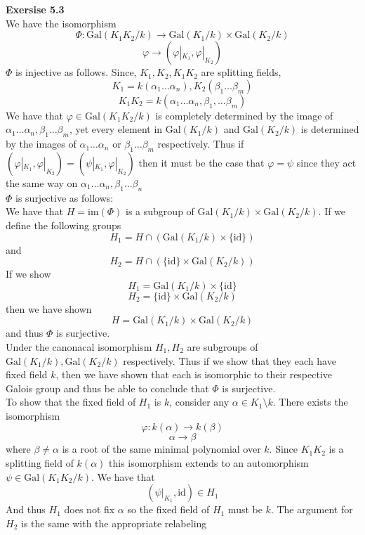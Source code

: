 \documentclass[12pt]{article}
\newenvironment{ques}[1]{\textbf{Exersise #1}\vspace{1 mm}\\ }{\bigskip}
\theoremstyle{definition}
\renewcommand{\a}{\alpha}
\renewcommand{\b}{\beta}
\newcommand{\Gal}{\text{Gal}}
\newcommand{\im}{\text{im}}
\newcommand{\id}{\text{id}}
\begin{document}
\begin{ques}{5.3}
	We have the isomorphism
	$$\Phi:\Gal(K_1K_2/k) \to \Gal(K_1/k) \times \Gal(K_2/k)$$
	$$\varphi \to (\varphi|_{K_1}, \varphi|_{K_2})$$
	$\Phi$ is injective as follows. Since, $K_1, K_2, K_1K_2$ are splitting fields,
	$$K_1 = k(\a_1 \dots \a_n), K_2(\b_1 \dots \b_m)$$
	$$K_1K_2 = k(\a_1 \dots \a_n, \b_1, \dots \b_m)$$
	We have that $\varphi \in \Gal(K_1K_2/k)$ is completely determined by the
	image of $\a_1 \dots \a_n, \b_1 \dots \b_m$, yet every element in
	$\Gal(K_1/k)$ and $\Gal(K_2/k)$ is determined by the images of $\a_1 \dots
	\a_n$ or $\b_1 \dots \b_m$ respectively. Thus if
	$(\varphi|_{K_1},\varphi|_{K_2}) = (\psi|_{K_1},\varphi|_{K_2})$ then it must
	be the case that $\varphi = \psi$ since they act the same way on $\a_1
	\dots \a_n, \b_1 \dots \b_n$
	\\
	$\Phi$ is surjective as follows: \\
	We have that $H = \im(\Phi)$ is a subgroup of $\Gal(K_1/k) \times
	\Gal(K_2/k)$. If we define the following groups
	$$H_1 = H \cap (\Gal(K_1/k) \times \{\id\})$$
	and
	$$H_2 = H \cap (\{\id\}\times \Gal(K_2/k))$$
	If we show 
	$$H_1 = \Gal(K_1/k) \times \{\id\}$$
	$$H_2 = \{\id\}\times \Gal(K_2/k)$$
	then we have shown 
	$$H = \Gal(K_1/k) \times \Gal(K_2/k)$$
	and thus $\Phi$ is surjective.\\
	Under the canonacal isomorphism $H_1, H_2$ are subgroups of $\Gal(K_1/k),
	\Gal(K_2/k)$ respectively. Thus if we show that they each have fixed field
	$k$, then we have shown that each is isomorphic to their respective Galois group
	and thus be able to conclude that $\Phi$ is surjective.\\
	To show that the fixed field of $H_1$ is $k$, consider any $\a \in K_1
	\setminus k$. There exists the isomorphism
	$$\varphi : k(\a) \to k(\beta)$$
	$$\a \to \b$$
	where $\b \neq \a$ is a root of the same minimal polynomial over $k$. Since
	$K_1K_2$ is a splitting field of $k(\a)$ this isomorphism extends to an
	automorphism $\psi \in \Gal(K_1K_2/k)$. We have that 
	$$(\psi|_{K_1}, \id) \in H_1$$
	And thus $H_1$ does not fix $\a$ so the fixed field of $H_1$ must be $k$.
	The argument for $H_2$ is the same with the appropriate relabeling
\end{ques}
\end{document}
